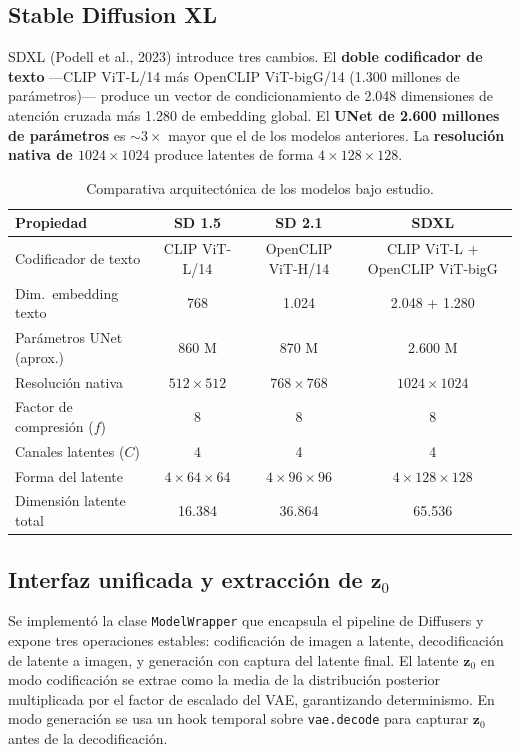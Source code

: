 \documentclass[12pt, a4paper, twoside]{book}
\newcommand{\z}{\mathbf{z}}
\begin{document}
\subsection{Stable Diffusion XL}

SDXL (Podell et al., 2023) introduce tres cambios. El \textbf{doble codificador de texto} ---CLIP ViT-L/14 más OpenCLIP ViT-bigG/14 (1.300 millones de parámetros)--- produce un vector de condicionamiento de 2.048 dimensiones de atención cruzada más 1.280 de embedding global. El \textbf{UNet de 2.600 millones de parámetros} es $\sim 3\times$ mayor que el de los modelos anteriores. La \textbf{resolución nativa de $1024 \times 1024$} produce latentes de forma $4 \times 128 \times 128$.

\begin{table}[htb]
\centering
\caption{Comparativa arquitectónica de los modelos bajo estudio.}
\label{tab:arquitecturas}
\small
\begin{tabular}{lccc}
\toprule
\textbf{Propiedad} & \textbf{SD 1.5} & \textbf{SD 2.1} & \textbf{SDXL} \\
\midrule
Codificador de texto & CLIP ViT-L/14 & OpenCLIP ViT-H/14 & CLIP ViT-L + OpenCLIP ViT-bigG \\
Dim.\ embedding texto & 768 & 1.024 & 2.048 + 1.280 \\
Parámetros UNet (aprox.) & 860 M & 870 M & 2.600 M \\
Resolución nativa & $512\times512$ & $768\times768$ & $1024\times1024$ \\
Factor de compresión ($f$) & 8 & 8 & 8 \\
Canales latentes ($C$) & 4 & 4 & 4 \\
Forma del latente & $4\times64\times64$ & $4\times96\times96$ & $4\times128\times128$ \\
Dimensión latente total & 16.384 & 36.864 & 65.536 \\
\bottomrule
\end{tabular}
\end{table}

\subsection{Interfaz unificada y extracción de $\z_0$}

Se implementó la clase \texttt{ModelWrapper} que encapsula el pipeline de Diffusers y expone tres operaciones estables: codificación de imagen a latente, decodificación de latente a imagen, y generación con captura del latente final. El latente $\z_0$ en modo codificación se extrae como la media de la distribución posterior multiplicada por el factor de escalado del VAE, garantizando determinismo. En modo generación se usa un hook temporal sobre \texttt{vae.decode} para capturar $\z_0$ antes de la decodificación.
\end{document}
